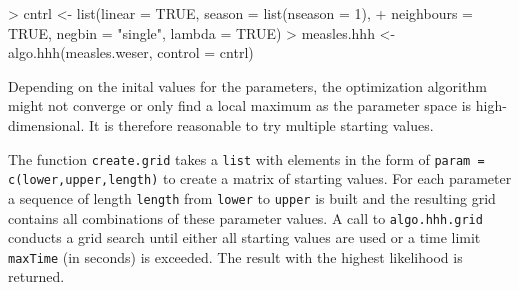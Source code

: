 \documentclass[a4paper,11pt]{article}
\begin{document}
\begin{Schunk}
\begin{Sinput}
> cntrl <- list(linear = TRUE, season = list(nseason = 1), 
+     neighbours = TRUE, negbin = "single", lambda = TRUE)
> measles.hhh <- algo.hhh(measles.weser, control = cntrl)
\end{Sinput}
\end{Schunk}

Depending on the inital values for the parameters, the optimization algorithm
might not converge or only find a local maximum as the parameter space is
high-dimensional.
It is therefore reasonable to try multiple starting values.

The function \texttt{create.grid} takes a \texttt{list} with elements in the
form of \texttt{param = c(lower,upper,length)} to create a matrix of starting
values.
For each parameter a sequence of length \texttt{length} from \texttt{lower}
to \texttt{upper} is built and the resulting grid contains all
combinations of these parameter values.
A call to \texttt{algo.hhh.grid} conducts a grid search
until either all starting values are used or a time limit \texttt{maxTime} (in seconds)
is exceeded. The result with the highest likelihood is returned.
\end{document}
